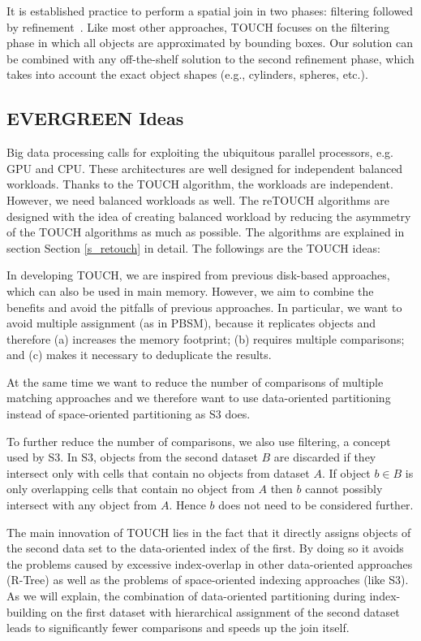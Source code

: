 \documentclass{vldb}
\newcommand{\sref}[1]{Section \ref{#1}}
\newcommand{\SJ}{TOUCH}
\newcommand{\newSJ}{EVERGREEN}
\begin{document}
It is established practice to perform a spatial join in two phases: filtering followed by refinement~\cite{twophasejoin}. Like most other approaches, TOUCH
focuses on the filtering phase in which all objects are approximated by bounding boxes. Our solution can be combined with any off-the-shelf solution to
the second refinement phase, which takes into account the exact object shapes (e.g., cylinders, spheres, etc.).

\subsection{{\newSJ} Ideas}

Big data processing calls for exploiting the ubiquitous parallel processors, e.g. GPU and CPU. These architectures are well designed for independent balanced workloads. Thanks to the {\SJ} algorithm, the workloads are independent. However, we need balanced workloads as well. The reTOUCH algorithms are designed with the idea of creating balanced workload by reducing the asymmetry of the TOUCH algorithms as much as possible. The algorithms are explained in section \sref{s_retouch} in detail.
The followings are the {\SJ} ideas:

In developing \SJ, we are inspired from previous disk-based approaches, which can also be used in main memory. However, we aim to combine the benefits and avoid
the pitfalls of previous approaches. In particular, we want to avoid multiple assignment (as in PBSM), because it replicates objects and therefore (a) increases
the memory footprint; (b) requires multiple comparisons; and (c) makes it necessary to deduplicate the results.

At the same time we want to reduce the number of comparisons of multiple matching approaches and we therefore want to use data-oriented partitioning instead of
space\hyp{}oriented partitioning as S3 does.

To further reduce the number of comparisons, we also use filtering, a concept used by S3. In S3, objects from the second dataset $B$ are discarded if they
intersect only with cells that contain no objects from dataset $A$. If object $b \in B$ is only overlapping cells that contain no object from $A$ then $b$
cannot possibly intersect with any object from $A$. Hence $b$ does not need to be considered further.

The main innovation of TOUCH lies in the fact that it directly assigns objects of the second data set to the data-oriented index of the first. By doing so it
avoids the problems caused by excessive index-overlap in other data-oriented approaches (R-Tree) as well as the problems of space-oriented indexing approaches
(like S3). As we will explain, the combination of data-oriented partitioning during index-building on the first dataset with hierarchical assignment of the
second dataset leads to significantly fewer comparisons and speeds up the join itself.
\end{document}
